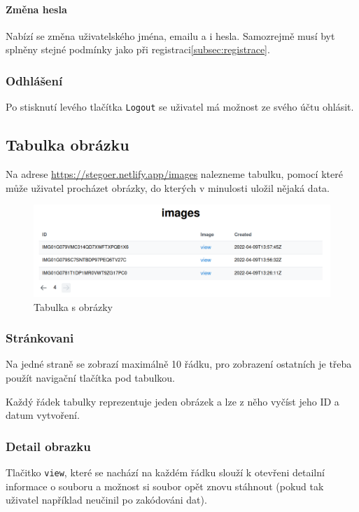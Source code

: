 \paragraph{Změna hesla}

Nabízí se změna uživatelského jména, emailu a i hesla.
Samozrejmě musí byt splněny stejné podmínky jako při
registraci\ref{subsec:registrace}.

\subsubsection{Odhlášení}

Po stisknutí levého tlačítka \texttt{Logout} se uživatel má možnost ze svého
účtu ohlásit.

\subsection{Tabulka obrázku}\label{subsec:tabulka-obrazku}
Na adrese \url{https://stegoer.netlify.app/images} nalezneme tabulku, pomocí
které může uživatel procházet obrázky, do kterých v minulosti uložil nějaká
data.

\begin{figure}
    \centering
    \includegraphics[scale=0.5]{assets/images/images-table}
    \caption{Tabulka s obrázky}\label{fig:tabulka-obrazky}
\end{figure}

\subsubsection{Stránkovani}\label{subsubsec:strankovani}
Na jedné straně se zobrazí maximálně 10 řádku, pro zobrazení ostatních je třeba
použít navigační tlačítka pod tabulkou.

Každý řádek tabulky reprezentuje jeden obrázek a lze z něho vyčíst jeho ID a
datum vytvoření.

\subsubsection{Detail obrazku}\label{subsubsec:detail-obrazku}
Tlačitko \texttt{view}, které se nachází na každém řádku slouží k otevřeni
detailní informace o souboru a možnost si soubor opět znovu stáhnout
(pokud tak uživatel například neučinil po zakódováni dat).

